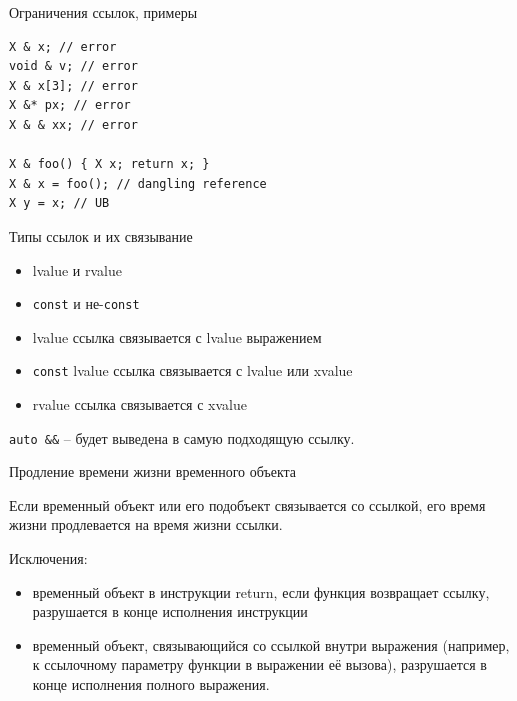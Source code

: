 \documentclass[unknownkeysallowed,xcolor=table]{beamer}
\begin{document}
\begin{frame}[fragile]{Ограничения ссылок, примеры}

\begin{lstlisting}
X & x; // error
void & v; // error
X & x[3]; // error
X &* px; // error
X & & xx; // error

X & foo() { X x; return x; }
X & x = foo(); // dangling reference
X y = x; // UB
\end{lstlisting}

\end{frame}

\begin{frame}[fragile]{Типы ссылок и их связывание}

\begin{itemize}
  \item lvalue и rvalue \vspace{0.5em}
  \item \lstinline{const} и не-\lstinline{const}
\end{itemize}

\vspace{1em}

\begin{itemize}
  \item lvalue ссылка связывается с lvalue выражением \vspace{0.5em}
  \item \lstinline{const} lvalue ссылка связывается с lvalue или xvalue \vspace{0.5em}
  \item rvalue ссылка связывается с xvalue
\end{itemize}

\vspace{1em}

\lstinline{auto &&} -- будет выведена в самую подходящую ссылку.

\end{frame}

\begin{frame}[fragile]{Продление времени жизни временного объекта}

Если временный объект или его подобъект связывается со ссылкой, его время жизни продлевается на время жизни ссылки.

\vspace{2em}

Исключения:
\begin{itemize}
  \item временный объект в инструкции return, если функция возвращает ссылку, разрушается в конце исполнения инструкции \vspace{1em}
  \item временный объект, связывающийся со ссылкой внутри выражения (например, к ссылочному параметру функции в выражении её вызова), разрушается в конце исполнения полного выражения.
\end{itemize}

\end{frame}
\end{document}
